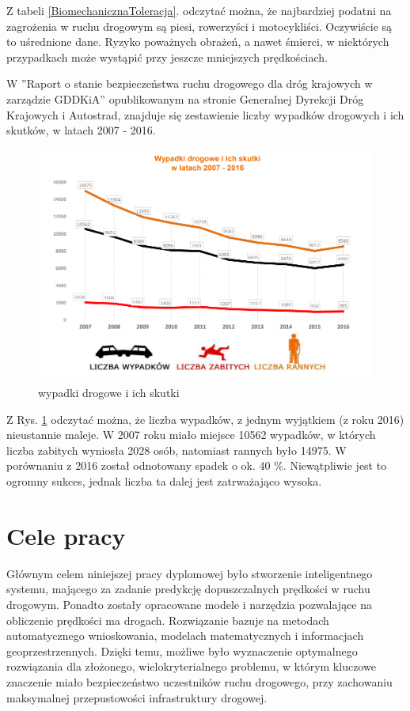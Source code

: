 Z tabeli \ref{BiomechanicznaToleracja}. odczytać można, że najbardziej podatni na zagrożenia w ruchu drogowym są piesi, rowerzyści i motocykliści. Oczywiście są to uśrednione dane. Ryzyko poważnych obrażeń, a nawet śmierci, w niektórych przypadkach może wystąpić przy jeszcze mniejszych prędkościach.

\newpage


W ''Raport o stanie bezpieczeństwa ruchu drogowego dla dróg krajowych w zarządzie GDDKiA'' opublikowanym na stronie Generalnej Dyrekcji Dróg Krajowych i Autostrad, znajduje się zestawienie liczby wypadków drogowych i ich skutków, w latach 2007 - 2016.

\begin{figure}[h]
\caption{wypadki drogowe i ich skutki}
\label{wypadkiSkutki}
\centering
\includegraphics[width=1\textwidth]{picture1}
\end{figure}

Z Rys. \ref{wypadkiSkutki} odczytać można, że liczba wypadków, z jednym wyjątkiem (z roku 2016) nieustannie maleje. W 2007 roku miało miejsce 10562 wypadków, w których liczba zabitych wyniosła 2028 osób, natomiast rannych było 14975. W porównaniu z 2016 został odnotowany spadek o ok. 40 \%. Niewątpliwie jest to ogromny sukces, jednak liczba ta dalej jest zatrważająco wysoka.


\section{Cele pracy}
\label{sec:celePracy}

Głównym celem niniejszej pracy dyplomowej było stworzenie inteligentnego systemu, mającego za zadanie predykcję dopuszczalnych prędkości w ruchu drogowym. Ponadto zostały opracowane modele i narzędzia pozwalające na obliczenie prędkości ma drogach. Rozwiązanie bazuje na metodach automatycznego wnioskowania, modelach matematycznych i informacjach geoprzestrzennych. Dzięki temu, możliwe było wyznaczenie optymalnego rozwiązania dla złożonego, wielokryterialnego problemu, w którym kluczowe znaczenie miało bezpieczeństwo uczestników ruchu drogowego, przy zachowaniu maksymalnej przepustowości infrastruktury drogowej.

